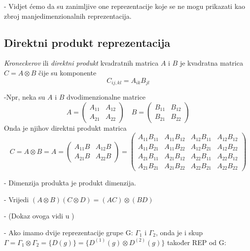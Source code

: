 - Vidjet ćemo da su zanimljive one reprezentacije koje se ne mogu
  prikazati kao zbroj manjedimenzionalnih reprezentacija.

\subsection*{Direktni produkt reprezentacija}

\emph{Kroneckerov} ili \emph{direktni produkt} kvadratnih matrica 
$A$ i $B$ je kvadratna matrica $C=A\otimes B$ čije su komponente
\begin{displaymath}
          C_{ij,kl}=A_{ik}B_{jl}
\end{displaymath}

-Npr, neka su $A$ i $B$ dvodimenzionalne matrice
\begin{displaymath}
A=\left( \begin{array}{cc}
    A_{11} & A_{12} \\
    A_{21} & A_{22}
\end{array} \right) \quad
B=\left( \begin{array}{cc}
    B_{11} & B_{12} \\
    B_{21} & B_{22}
\end{array}\right)  
\end{displaymath}
Onda je njihov direktni produkt matrica
\begin{displaymath}
C=A\otimes B= 
A=\left( \begin{array}{cc}
    A_{11} B & A_{12} B \\
    A_{21} B & A_{22} B
\end{array} \right) =
\left(
\begin{array}{cccc}
  A_{11}B_{11} & A_{11}B_{12} & A_{12}B_{11} & A_{12}B_{12} \\
  A_{11}B_{21} & A_{11}B_{22} & A_{12}B_{21} & A_{12}B_{22} \\
  A_{21}B_{11} & A_{21}B_{12} & A_{22}B_{11} & A_{22}B_{12} \\
  A_{21}B_{21} & A_{21}B_{22} & A_{22}B_{21} & A_{22}B_{22} 
\end{array} \right)
\end{displaymath}

- Dimenzija produkta je produkt dimenzija.

- Vrijedi $(A\otimes B)(C\otimes D)=(AC)\otimes(BD)$

- (Dokaz ovoga vidi u \cite{Jones98})

- Ako imamo dvije reprezentacije grupe G: $\Gamma_1$ i $\Gamma_2$,
onda je i skup $\Gamma=\Gamma_1 \otimes \Gamma_2 = \{D(g)\}=
\{D^{(1)}(g)\otimes D^{(2)}(g)\}$ također REP od G:

